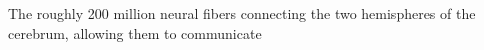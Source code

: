 The roughly 200 million neural fibers connecting the two hemispheres of the cerebrum, allowing them to communicate
